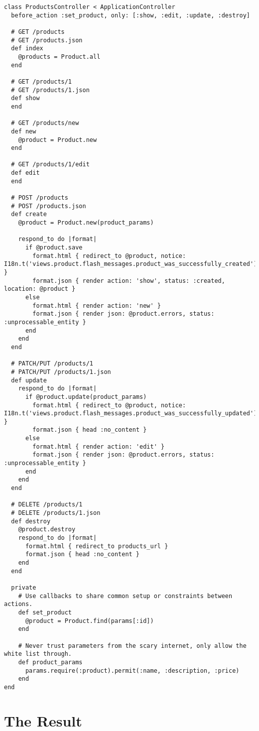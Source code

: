\documentclass[a4paper]{book}
\begin{document}
\begin{shaded}\begin{verbatim}
class ProductsController < ApplicationController
  before_action :set_product, only: [:show, :edit, :update, :destroy]

  # GET /products
  # GET /products.json
  def index
    @products = Product.all
  end

  # GET /products/1
  # GET /products/1.json
  def show
  end

  # GET /products/new
  def new
    @product = Product.new
  end

  # GET /products/1/edit
  def edit
  end

  # POST /products
  # POST /products.json
  def create
    @product = Product.new(product_params)

    respond_to do |format|
      if @product.save
        format.html { redirect_to @product, notice: I18n.t('views.product.flash_messages.product_was_successfully_created') }
        format.json { render action: 'show', status: :created, location: @product }
      else
        format.html { render action: 'new' }
        format.json { render json: @product.errors, status: :unprocessable_entity }
      end
    end
  end

  # PATCH/PUT /products/1
  # PATCH/PUT /products/1.json
  def update
    respond_to do |format|
      if @product.update(product_params)
        format.html { redirect_to @product, notice: I18n.t('views.product.flash_messages.product_was_successfully_updated') }
        format.json { head :no_content }
      else
        format.html { render action: 'edit' }
        format.json { render json: @product.errors, status: :unprocessable_entity }
      end
    end
  end

  # DELETE /products/1
  # DELETE /products/1.json
  def destroy
    @product.destroy
    respond_to do |format|
      format.html { redirect_to products_url }
      format.json { head :no_content }
    end
  end

  private
    # Use callbacks to share common setup or constraints between actions.
    def set_product
      @product = Product.find(params[:id])
    end

    # Never trust parameters from the scary internet, only allow the white list through.
    def product_params
      params.require(:product).permit(:name, :description, :price)
    end
end
\end{verbatim}\end{shaded}

\section{The Result}\label{the-result}
\end{document}
